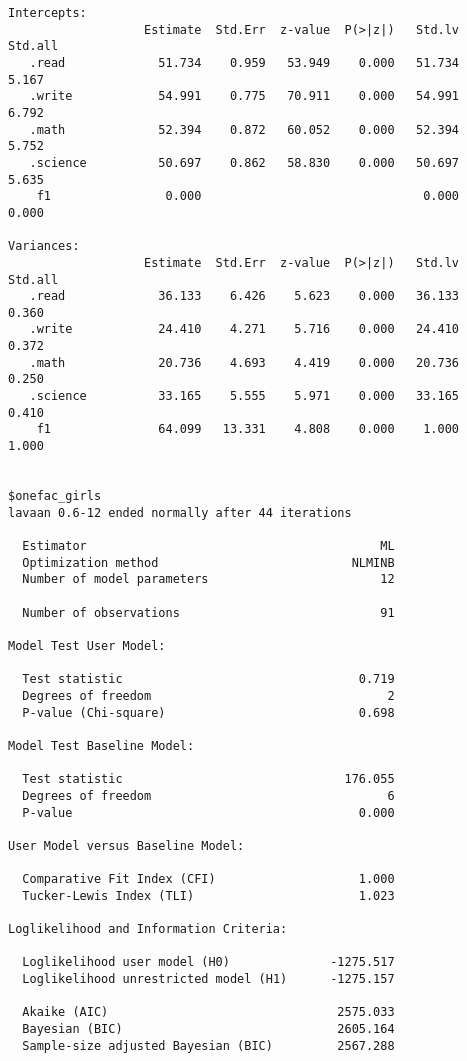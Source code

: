 \documentclass[
  letterpaper,
  DIV=11,
  numbers=noendperiod]{scrreprt}
\begin{document}
\begin{verbatim}
Intercepts:
                   Estimate  Std.Err  z-value  P(>|z|)   Std.lv  Std.all
   .read             51.734    0.959   53.949    0.000   51.734    5.167
   .write            54.991    0.775   70.911    0.000   54.991    6.792
   .math             52.394    0.872   60.052    0.000   52.394    5.752
   .science          50.697    0.862   58.830    0.000   50.697    5.635
    f1                0.000                               0.000    0.000

Variances:
                   Estimate  Std.Err  z-value  P(>|z|)   Std.lv  Std.all
   .read             36.133    6.426    5.623    0.000   36.133    0.360
   .write            24.410    4.271    5.716    0.000   24.410    0.372
   .math             20.736    4.693    4.419    0.000   20.736    0.250
   .science          33.165    5.555    5.971    0.000   33.165    0.410
    f1               64.099   13.331    4.808    0.000    1.000    1.000


$onefac_girls
lavaan 0.6-12 ended normally after 44 iterations

  Estimator                                         ML
  Optimization method                           NLMINB
  Number of model parameters                        12

  Number of observations                            91

Model Test User Model:
                                                      
  Test statistic                                 0.719
  Degrees of freedom                                 2
  P-value (Chi-square)                           0.698

Model Test Baseline Model:

  Test statistic                               176.055
  Degrees of freedom                                 6
  P-value                                        0.000

User Model versus Baseline Model:

  Comparative Fit Index (CFI)                    1.000
  Tucker-Lewis Index (TLI)                       1.023

Loglikelihood and Information Criteria:

  Loglikelihood user model (H0)              -1275.517
  Loglikelihood unrestricted model (H1)      -1275.157
                                                      
  Akaike (AIC)                                2575.033
  Bayesian (BIC)                              2605.164
  Sample-size adjusted Bayesian (BIC)         2567.288


\end{verbatim}
\end{document}

